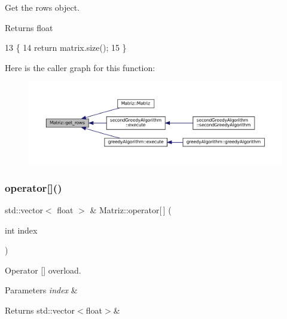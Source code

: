 Get the rows object. 

\begin{DoxyReturn}{Returns}
float 
\end{DoxyReturn}

\begin{DoxyCode}
13 \{
14   \textcolor{keywordflow}{return} matrix.size();
15 \}
\end{DoxyCode}
Here is the caller graph for this function\+:
\nopagebreak
\begin{figure}[H]
\begin{center}
\leavevmode
\includegraphics[width=350pt]{classMatriz_a6b18342f8c083baece693ff41185a206_icgraph}
\end{center}
\end{figure}
\mbox{\label{classMatriz_a5516a9b9524e4604d4b3040628be50e9}} 
\subsubsection{\texorpdfstring{operator[]()}{operator[]()}}
{\footnotesize\ttfamily std\+::vector$<$ float $>$ \& Matriz\+::operator\mbox{[}$\,$\mbox{]} (\begin{DoxyParamCaption}\item[{int}]{index }\end{DoxyParamCaption})}



Operator \mbox{[}\mbox{]} overload. 


\begin{DoxyParams}{Parameters}
{\em index} & \\
\hline
\end{DoxyParams}
\begin{DoxyReturn}{Returns}
std\+::vector$<$float$>$\& 
\end{DoxyReturn}

